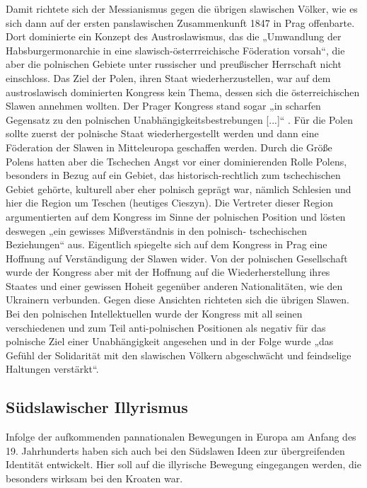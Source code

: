 \documentclass[12pt,headsepline,a4paper]{scrartcl}
\begin{document}
Damit richtete sich der Messianismus gegen die übrigen slawischen Völker, wie es sich
dann auf der ersten panslawischen Zusammenkunft 1847 in Prag offenbarte. Dort dominierte
ein Konzept des Austroslawismus, das die „Umwandlung der Habsburgermonarchie in eine
slawisch-österrreichische Föderation vorsah“\autocite[103]{cetnarow}, die aber die
polnischen Gebiete unter russischer und preußischer Herrschaft nicht einschloss. Das Ziel der
Polen, ihren Staat wiederherzustellen, war auf dem austroslawisch dominierten Kongress kein
Thema, dessen sich die österreichischen Slawen annehmen wollten. Der Prager Kongress
stand sogar „in scharfen Gegensatz zu den polnischen Unabhängigkeitsbestrebungen [...]“\autocite[110]{cetnarow}
. Für die Polen sollte zuerst der polnische Staat wiederhergestellt
werden und dann eine Föderation der Slawen in Mitteleuropa geschaffen werden. Durch die
Größe Polens hatten aber die Tschechen Angst vor einer dominierenden Rolle Polens,
besonders in Bezug auf ein Gebiet, das historisch-rechtlich zum tschechischen Gebiet gehörte,
kulturell aber eher polnisch geprägt war, nämlich Schlesien und hier die Region um Teschen
(heutiges Cieszyn). Die Vertreter dieser Region argumentierten auf dem Kongress im Sinne
der polnischen Position und lösten deswegen „ein gewisses Mißverständnis in den polnisch-
tschechischen Beziehungen“\autocite[112]{cetnarow} aus. Eigentlich spiegelte sich auf dem
Kongress in Prag eine Hoffnung auf Verständigung der Slawen wider. Von der polnischen
Gesellschaft wurde der Kongress aber mit der Hoffnung auf die Wiederherstellung ihres
Staates und einer gewissen Hoheit gegenüber anderen Nationalitäten, wie den Ukrainern
verbunden. Gegen diese Ansichten richteten sich die übrigen Slawen. Bei den polnischen
Intellektuellen wurde der Kongress mit all seinen verschiedenen und zum Teil anti-polnischen
Positionen als negativ für das polnische Ziel einer Unabhängigkeit angesehen und in der
Folge wurde „das Gefühl der Solidarität mit den slawischen Völkern abgeschwächt und
feindselige Haltungen verstärkt“\autocite[114]{cetnarow}.

\subsection{Südslawischer Illyrismus}
Infolge der aufkommenden pannationalen Bewegungen in Europa am Anfang des 19.
Jahrhunderts haben sich auch bei den Südslawen Ideen zur übergreifenden Identität
entwickelt. Hier soll auf die illyrische Bewegung eingegangen werden, die besonders wirksam
bei den Kroaten war.
\end{document}
